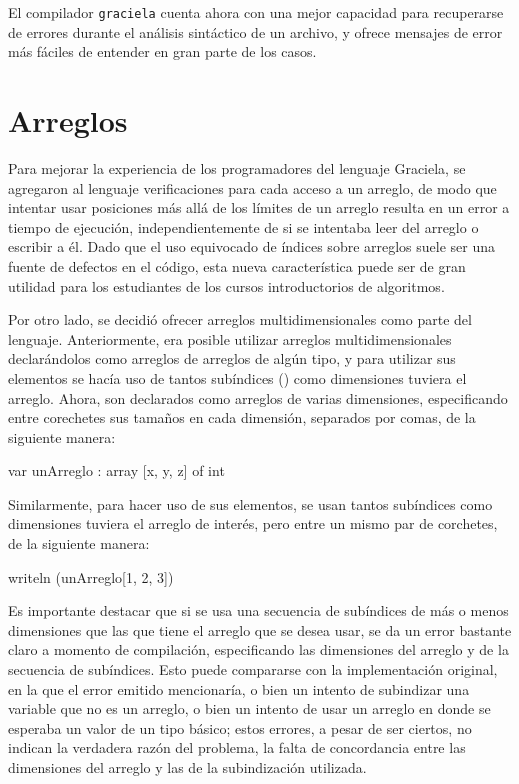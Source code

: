 El compilador \texttt{graciela} cuenta ahora con una mejor capacidad para
recuperarse de errores durante el análisis sintáctico de un archivo, y ofrece
mensajes de error más fáciles de entender en gran parte de los casos.

\section{Arreglos}

Para mejorar la experiencia de los programadores del lenguaje Graciela, se
agregaron al lenguaje verificaciones para cada acceso a un arreglo, de modo que
intentar usar posiciones más allá de los límites de un arreglo resulta en un
error a tiempo de ejecución, independientemente de si se intentaba leer del
arreglo o escribir a él. Dado que el uso equivocado de índices sobre arreglos
suele ser una fuente de defectos en el código, esta nueva característica puede
ser de gran utilidad para los estudiantes de los cursos introductorios de
algoritmos.

Por otro lado, se decidió ofrecer arreglos multidimensionales como parte del
lenguaje. Anteriormente, era posible utilizar arreglos multidimensionales
declarándolos como arreglos de arreglos de algún tipo, y para utilizar sus
elementos se hacía uso de tantos subíndices (\ingra{[i]}) como dimensiones
tuviera el arreglo. Ahora, son declarados como arreglos de varias dimensiones,
especificando entre corechetes sus tamaños en cada dimensión, separados por
comas, de la siguiente manera:

\begin{gracielacode}
var unArreglo : array [x, y, z] of int
\end{gracielacode}

Similarmente, para hacer uso de sus elementos, se usan tantos subíndices como
dimensiones tuviera el arreglo de interés, pero entre un mismo par de corchetes,
de la siguiente manera:

\begin{gracielacode}
writeln (unArreglo[1, 2, 3])
\end{gracielacode}

Es importante destacar que si se usa una secuencia de subíndices de más o menos
dimensiones que las que tiene el arreglo que se desea usar, se da un error
bastante claro a momento de compilación, especificando las dimensiones del
arreglo y de la secuencia de subíndices. Esto puede compararse con la
implementación original, en la que el error emitido mencionaría, o bien un
intento de subindizar una variable que no es un arreglo, o bien un intento de
usar un arreglo en donde se esperaba un valor de un tipo básico; estos errores,
a pesar de ser ciertos, no indican la verdadera razón del problema, la falta de
concordancia entre las dimensiones del arreglo y las de la subindización
utilizada.

